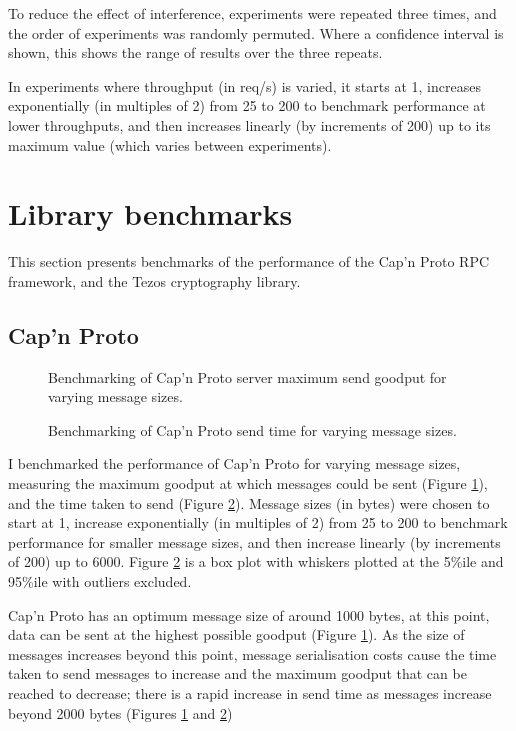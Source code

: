 To reduce the effect of interference, experiments were repeated three times, and the order of experiments was randomly permuted. Where a confidence interval is shown, this shows the range of results over the three repeats.

In experiments where throughput (in req/s) is varied, it starts at 1, increases exponentially (in multiples of 2) from 25 to 200 to benchmark performance at lower throughputs, and then increases linearly (by increments of 200) up to its maximum value (which varies between experiments).

\section{Library benchmarks} \label{librarybenchmarks}
This section presents benchmarks of the performance of the Cap'n Proto RPC framework, and the Tezos cryptography library.

\subsection{Cap'n Proto} \label{capnpbenchmark}

\begin{figure}[h!]
\centering
\resizebox{.6\textwidth}{!}{}
\caption{Benchmarking of Cap'n Proto server maximum send goodput for varying message sizes.}
\label{sizegoodput}
\end{figure}

\begin{figure}[h!]
\centering
\resizebox{.6\textwidth}{!}{}
\caption{Benchmarking of Cap'n Proto send time for varying message sizes.}
\label{sizesendtime}
\end{figure}

I benchmarked the performance of Cap'n Proto \cite{capnp} for varying message sizes, measuring the maximum goodput at which messages could be sent (Figure \ref{sizegoodput}), and the time taken to send (Figure \ref{sizesendtime}). Message sizes (in bytes) were chosen to start at 1, increase exponentially (in multiples of 2) from 25 to 200 to benchmark performance for smaller message sizes, and then increase linearly (by increments of 200) up to 6000. Figure \ref{sizesendtime} is a box plot with whiskers plotted at the 5\%ile and 95\%ile with outliers excluded.

Cap'n Proto has an optimum message size of around 1000 bytes, at this point, data can be sent at the highest possible goodput (Figure \ref{sizegoodput}). As the size of messages increases beyond this point, message serialisation costs cause the time taken to send messages to increase and the maximum goodput that can be reached to decrease; there is a rapid increase in send time as messages increase beyond 2000 bytes (Figures \ref{sizegoodput} and \ref{sizesendtime})

